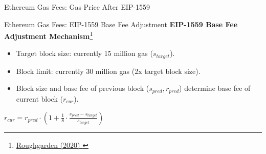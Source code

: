 \documentclass[handout]{beamer}
\begin{document}
\begin{frame}{Ethereum Gas Fees: Gas Price After EIP-1559}
	\begin{figure}
		
	\end{figure}
	
	\vspace{-1.25em}
	
	
\end{frame}

\begin{frame}{Ethereum Gas Fees: EIP-1559 Base Fee Adjustment}
	\textbf{EIP-1559 Base Fee Adjustment Mechanism}\footnote{\href{https://timroughgarden.org/papers/eip1559.pdf}{Roughgarden (2020) \link}}
	\vspace{0.5 em}
	\begin{itemize}
		\item Target block size: currently 15 million gas ($s_{target}$).
		\vspace{0.5 em}
		\item Block limit: currently 30 million gas (2x target block size).
		\vspace{0.5 em}
		\item Block size and base fee of previous block ($s_{pred}, r_{pred}$) determine base fee of current block ($r_{cur}$).\\
	\end{itemize}

		\vspace{1.0 em}
\begin{center}
		$r_{cur} = r_{pred}\cdot\left(1+\frac{1}{8}\cdot\frac{s_{pred}-s_{target}}{s_{target}}\right)$
\end{center}
\end{frame}
\end{document}
